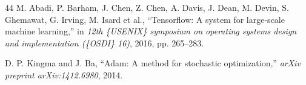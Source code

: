 \documentclass[11pt]{article}
\begin{document}
\begin{thebibliography}{44}
M. Abadi, P. Barham, J. Chen, Z. Chen, A. Davis, J. Dean, M. Devin, S. Ghemawat, G. Irving, M. Isard et al., ``Tensorflow: A system for large-scale machine learning,'' in \emph{12th \{USENIX\} symposium on operating systems design and implementation (\{OSDI\} 16)}, 2016, pp. 265--283.

D. P. Kingma and J. Ba, ``Adam: A method for stochastic optimization,'' \emph{arXiv preprint arXiv:1412.6980}, 2014.

\end{thebibliography}
\end{document}
